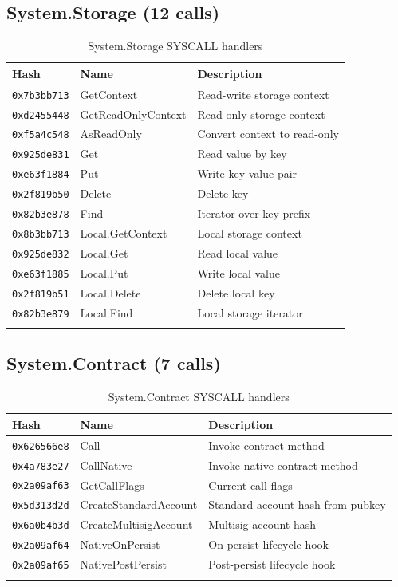\documentclass[11pt,a4paper]{article}
\begin{document}
\subsection{System.Storage (12 calls)}

\begin{longtable}{@{}lp{3.5cm}p{5.5cm}@{}}
\toprule
\textbf{Hash} & \textbf{Name} & \textbf{Description} \\
\midrule
\endhead
\texttt{0x7b3bb713} & GetContext & Read-write storage context \\
\texttt{0xd2455448} & GetReadOnlyContext & Read-only storage context \\
\texttt{0xf5a4c548} & AsReadOnly & Convert context to read-only \\
\texttt{0x925de831} & Get & Read value by key \\
\texttt{0xe63f1884} & Put & Write key-value pair \\
\texttt{0x2f819b50} & Delete & Delete key \\
\texttt{0x82b3e878} & Find & Iterator over key-prefix \\
\texttt{0x8b3bb713} & Local.GetContext & Local storage context \\
\texttt{0x925de832} & Local.Get & Read local value \\
\texttt{0xe63f1885} & Local.Put & Write local value \\
\texttt{0x2f819b51} & Local.Delete & Delete local key \\
\texttt{0x82b3e879} & Local.Find & Local storage iterator \\
\bottomrule
\caption{System.Storage SYSCALL handlers}
\end{longtable}

\subsection{System.Contract (7 calls)}

\begin{longtable}{@{}lp{4cm}p{5cm}@{}}
\toprule
\textbf{Hash} & \textbf{Name} & \textbf{Description} \\
\midrule
\endhead
\texttt{0x626566e8} & Call & Invoke contract method \\
\texttt{0x4a783e27} & CallNative & Invoke native contract method \\
\texttt{0x2a09af63} & GetCallFlags & Current call flags \\
\texttt{0x5d313d2d} & CreateStandardAccount & Standard account hash from pubkey \\
\texttt{0x6a0b4b3d} & CreateMultisigAccount & Multisig account hash \\
\texttt{0x2a09af64} & NativeOnPersist & On-persist lifecycle hook \\
\texttt{0x2a09af65} & NativePostPersist & Post-persist lifecycle hook \\
\bottomrule
\caption{System.Contract SYSCALL handlers}
\end{longtable}
\end{document}
